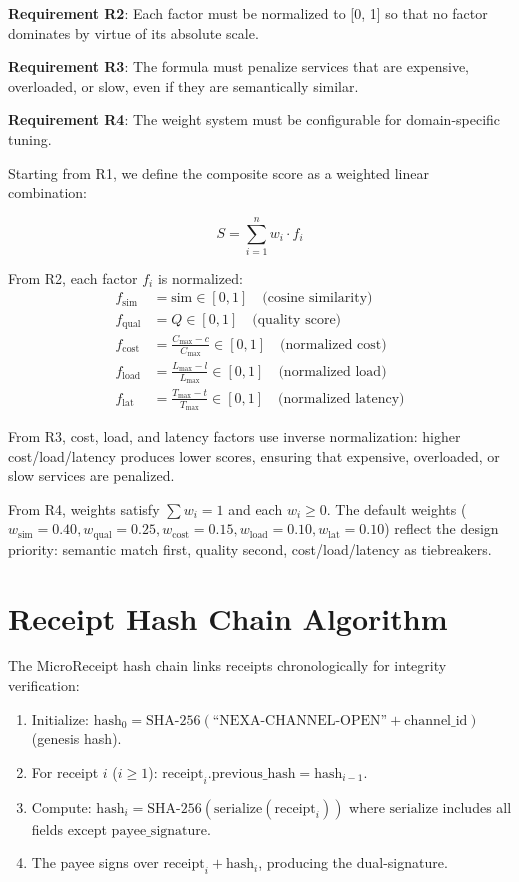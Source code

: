 \textbf{Requirement R2}: Each factor must be normalized to [0, 1] so that no factor dominates by virtue of its absolute scale.

\textbf{Requirement R3}: The formula must penalize services that are expensive, overloaded, or slow, even if they are semantically similar.

\textbf{Requirement R4}: The weight system must be configurable for domain-specific tuning.

Starting from R1, we define the composite score as a weighted linear combination:

\begin{equation}
S = \sum_{i=1}^{n} w_i \cdot f_i
\end{equation}

From R2, each factor $f_i$ is normalized:
\begin{align}
f_{\text{sim}} &= \text{sim} \in [0, 1] \quad \text{(cosine similarity)} \\
f_{\text{qual}} &= Q \in [0, 1] \quad \text{(quality score)} \\
f_{\text{cost}} &= \frac{C_{\max} - c}{C_{\max}} \in [0, 1] \quad \text{(normalized cost)} \\
f_{\text{load}} &= \frac{L_{\max} - l}{L_{\max}} \in [0, 1] \quad \text{(normalized load)} \\
f_{\text{lat}} &= \frac{T_{\max} - t}{T_{\max}} \in [0, 1] \quad \text{(normalized latency)}
\end{align}

From R3, cost, load, and latency factors use inverse normalization: higher cost/load/latency produces lower scores, ensuring that expensive, overloaded, or slow services are penalized.

From R4, weights satisfy $\sum w_i = 1$ and each $w_i \geq 0$. The default weights ($w_{\text{sim}}=0.40, w_{\text{qual}}=0.25, w_{\text{cost}}=0.15, w_{\text{load}}=0.10, w_{\text{lat}}=0.10$) reflect the design priority: semantic match first, quality second, cost/load/latency as tiebreakers.

\section{Receipt Hash Chain Algorithm}

The MicroReceipt hash chain links receipts chronologically for integrity verification:

\begin{enumerate}
  \item Initialize: $\text{hash}_0 = \text{SHA-256}(\text{``NEXA-CHANNEL-OPEN''} + \text{channel\_id})$ (genesis hash).
  \item For receipt $i$ ($i \geq 1$): $\text{receipt}_i.\text{previous\_hash} = \text{hash}_{i-1}$.
  \item Compute: $\text{hash}_i = \text{SHA-256}(\text{serialize}(\text{receipt}_i))$ where $\text{serialize}$ includes all fields except $\text{payee\_signature}$.
  \item The payee signs over $\text{receipt}_i + \text{hash}_i$, producing the dual-signature.
\end{enumerate}

